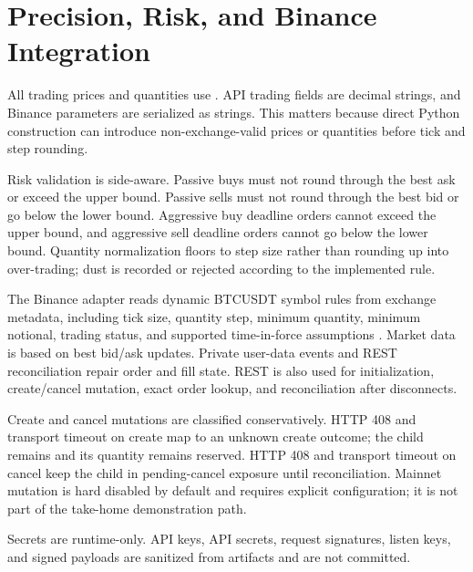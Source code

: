 \section{Precision, Risk, and Binance Integration}

All trading prices and quantities use . API trading fields are decimal strings, and Binance parameters are serialized as strings. This matters because direct Python  construction can introduce non-exchange-valid prices or quantities before tick and step rounding.

Risk validation is side-aware. Passive buys must not round through the best ask or exceed the upper bound. Passive sells must not round through the best bid or go below the lower bound. Aggressive buy deadline orders cannot exceed the upper bound, and aggressive sell deadline orders cannot go below the lower bound. Quantity normalization floors to step size rather than rounding up into over-trading; dust is recorded or rejected according to the implemented rule.

The Binance adapter reads dynamic BTCUSDT symbol rules from exchange metadata, including tick size, quantity step, minimum quantity, minimum notional, trading status, and supported time-in-force assumptions \citep{binance-usdm-docs}. Market data is based on best bid/ask updates. Private user-data events and REST reconciliation repair order and fill state. REST is also used for initialization, create/cancel mutation, exact order lookup, and reconciliation after disconnects.

Create and cancel mutations are classified conservatively. HTTP 408 and transport timeout on create map to an unknown create outcome; the child remains  and its quantity remains reserved. HTTP 408 and transport timeout on cancel keep the child in pending-cancel exposure until reconciliation. Mainnet mutation is hard disabled by default and requires explicit configuration; it is not part of the take-home demonstration path.

Secrets are runtime-only. API keys, API secrets, request signatures, listen keys, and signed payloads are sanitized from artifacts and are not committed.

